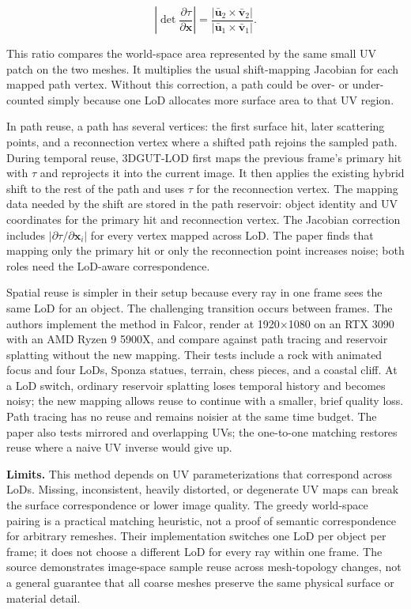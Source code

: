 \[\left|\det\frac{\partial\tau}{\partial\mathbf{x}}\right|=\frac{|\bar{\mathbf{u}}_2\times\bar{\mathbf{v}}_2|}{|\bar{\mathbf{u}}_1\times\bar{\mathbf{v}}_1|}.\]

This ratio compares the world-space area represented by the same small UV patch on the two meshes. It multiplies the usual shift-mapping Jacobian for each mapped path vertex. Without this correction, a path could be over- or under-counted simply because one LoD allocates more surface area to that UV region.

In path reuse, a path has several vertices: the first surface hit, later scattering points, and a reconnection vertex where a shifted path rejoins the sampled path. During temporal reuse, 3DGUT-LOD first maps the previous frame's primary hit with \(\tau\) and reprojects it into the current image. It then applies the existing hybrid shift to the rest of the path and uses \(\tau\) for the reconnection vertex. The mapping data needed by the shift are stored in the path reservoir: object identity and UV coordinates for the primary hit and reconnection vertex. The Jacobian correction includes \(|\partial\tau/\partial\mathbf{x}_i|\) for every vertex mapped across LoD. The paper finds that mapping only the primary hit or only the reconnection point increases noise; both roles need the LoD-aware correspondence.

Spatial reuse is simpler in their setup because every ray in one frame sees the same LoD for an object. The challenging transition occurs between frames. The authors implement the method in Falcor, render at 1920×1080 on an RTX 3090 with an AMD Ryzen 9 5900X, and compare against path tracing and reservoir splatting without the new mapping. Their tests include a rock with animated focus and four LoDs, Sponza statues, terrain, chess pieces, and a coastal cliff. At a LoD switch, ordinary reservoir splatting loses temporal history and becomes noisy; the new mapping allows reuse to continue with a smaller, brief quality loss. Path tracing has no reuse and remains noisier at the same time budget. The paper also tests mirrored and overlapping UVs; the one-to-one matching restores reuse where a naive UV inverse would give up.

\textbf{Limits.} This method depends on UV parameterizations that correspond across LoDs. Missing, inconsistent, heavily distorted, or degenerate UV maps can break the surface correspondence or lower image quality. The greedy world-space pairing is a practical matching heuristic, not a proof of semantic correspondence for arbitrary remeshes. Their implementation switches one LoD per object per frame; it does not choose a different LoD for every ray within one frame. The source demonstrates image-space sample reuse across mesh-topology changes, not a general guarantee that all coarse meshes preserve the same physical surface or material detail.


